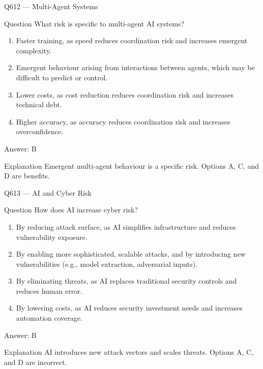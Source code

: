 \documentclass[aspectratio=169,8pt]{beamer}
\begin{document}
	\begin{frame}{Q612 --- Multi-Agent Systems}
		\begin{block}{Question}
			What risk is specific to multi-agent AI systems?
			\begin{enumerate}
				\item Faster training, as speed reduces coordination risk and increases emergent complexity.
				\item Emergent behaviour arising from interactions between agents, which may be difficult to predict or control.
				\item Lower costs, as cost reduction reduces coordination risk and increases technical debt.
				\item Higher accuracy, as accuracy reduces coordination risk and increases overconfidence.
			\end{enumerate}
		\end{block}
		\begin{exampleblock}{Answer: B}\end{exampleblock}
		\begin{block}{Explanation}
			Emergent multi-agent behaviour is a specific risk. Options A, C, and D are benefits.
		\end{block}
	\end{frame}
	
	\begin{frame}{Q613 --- AI and Cyber Risk}
		\begin{block}{Question}
			How does AI increase cyber risk?
			\begin{enumerate}
				\item By reducing attack surface, as AI simplifies infrastructure and reduces vulnerability exposure.
				\item By enabling more sophisticated, scalable attacks, and by introducing new vulnerabilities (e.g., model extraction, adversarial inputs).
				\item By eliminating threats, as AI replaces traditional security controls and reduces human error.
				\item By lowering costs, as AI reduces security investment needs and increases automation coverage.
			\end{enumerate}
		\end{block}
		\begin{exampleblock}{Answer: B}\end{exampleblock}
		\begin{block}{Explanation}
			AI introduces new attack vectors and scales threats. Options A, C, and D are incorrect.
		\end{block}
	\end{frame}
	
\end{document}
